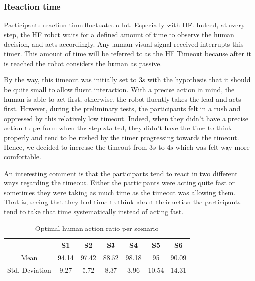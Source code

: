 \subsubsection*{Reaction time}
Participants reaction time fluctuates a lot. Especially with HF. Indeed, at every step, the HF robot waits for a defined amount of time to observe the human decision, and acts accordingly. Any human visual signal received interrupts this timer. This amount of time will be referred to as the HF Timeout because after it is reached the robot considers the human as passive.

By the way, this timeout was initially set to 3$s$ with the hypothesis that it should be quite small to allow fluent interaction. With a precise action in mind, the human is able to act first, otherwise, the robot fluently takes the lead and acts first. However, during the preliminary tests, the participants felt in a rush and oppressed by this relatively low timeout. Indeed, when they didn't have a precise action to perform when the step started, they didn't have the time to think properly and tend to be rushed by the timer progressing towards the timeout. Hence, we decided to increase the timeout from 3$s$ to 4$s$ which was felt way more comfortable. 

An interesting comment is that the participants tend to react in two different ways regarding the timeout. Either the participants were acting quite fast or sometimes they were taking as much time as the timeout was allowing them. That is, seeing that they had time to think about their action the participants tend to take that time systematically instead of acting fast. 


\begin{table}
    \caption{Optimal human action ratio per scenario}
    \begin{center}
    \begin{tabular}{c|c|c|c|c|c|c|}
        \cline{2-7}
                                                & S1    & S2    & S3    & S4    & S5    & S6\\
        \hline
        \multicolumn{1}{|c|}{Mean}              & 94.14 & 97.42 & 88.52 & 98.18 & 95    & 90.09 \\
        \hline
        \multicolumn{1}{|c|}{Std. Deviation}    & 9.27  & 5.72  & 8.37  & 3.96  & 10.54 & 14.31 \\
        \hline
    \end{tabular}
    \end{center}
    \label{tab:optimal_human_ratio}
\end{table}

